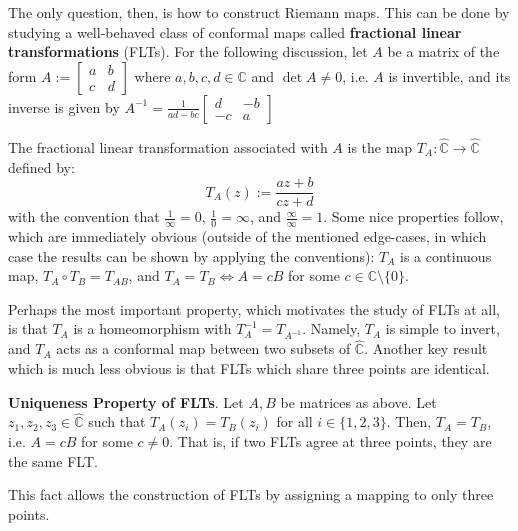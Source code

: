 The only question, then, is how to construct Riemann maps. This can be done by studying a well-behaved class of conformal maps called \textbf{fractional linear transformations} (FLTs). For the following discussion, let $A$ be a matrix of the form $A:=\begin{bmatrix}
    a & b\\
    c & d
\end{bmatrix}$ where $a,b,c,d\in\mathbb{C}$ and $\det A \neq 0$, i.e. $A$ is invertible, and its inverse is given by $A^{-1} = \frac{1}{ad-bc}\begin{bmatrix}
    d & -b\\
    -c & a
\end{bmatrix}$

The fractional linear transformation associated with $A$ is the map $T_A:\hat{\mathbb{C}}\to\hat{\mathbb{C}}$ defined by: \[T_A(z) := \frac{az+b}{cz+d}\] with the convention that $\frac{1}{\infty} = 0$, $\frac{1}{0}=\infty$, and $\frac{\infty}{\infty} = 1$. Some nice properties follow, which are immediately obvious (outside of the mentioned edge-cases, in which case the results can be shown by applying the conventions): $T_A$ is a continuous map, $T_A\circ T_B= T_{AB}$, and $T_A=T_B\iff A=c B$ for some $c\in\mathbb{C}\setminus\{0\}$. 

Perhaps the most important property, which motivates the study of FLTs at all, is that $T_A$ is a homeomorphism with $T_A^{-1} = T_{A^{-1}}$. Namely, $T_A$ is simple to invert, and $T_A$ acts as a conformal map between two subsets of $\hat{\mathbb{C}}$. Another key result which is much less obvious is that FLTs which share three points are identical.

\textbf{Uniqueness Property of FLTs}. Let $A,B$ be matrices as above. Let $z_1,z_2,z_3\in\hat{\mathbb{C}}$ such that $T_A(z_i) = T_B(z_i)$ for all $i\in\{1,2,3\}$. Then, $T_A=T_B$, i.e. $A=cB$ for some $c\neq 0$. That is, if two FLTs agree at three points, they are the same FLT.

This fact allows the construction of FLTs by assigning a mapping to only three points.

